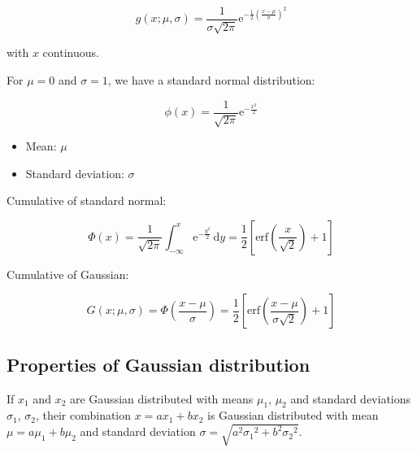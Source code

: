 \begin{equation}\label{eq:gaussian_distr}
	g(x ; \mu, \sigma) = \frac{1}{\sigma \sqrt{2 \pi}} 
	\mathrm{e}^{- \frac{1}{2} {\left( \frac{x - \mu}{\sigma} \right)}^{2}}
\end{equation}

with $x$ continuous. 

For $\mu = 0$ and $\sigma = 1$, we have a standard normal distribution:

\begin{equation}\label{eq:std_normal_distr}
	\phi(x) = \frac{1}{\sqrt{2 \pi}} \mathrm{e}^{- \frac{x^{2}}{2}}
\end{equation}

\begin{itemize}
	\item Mean: $\mu$
	\item Standard deviation: $\sigma$
\end{itemize}

Cumulative of standard normal:

\begin{equation}\label{eq:cdf_std_normal}
	\Phi(x) = \frac{1}{\sqrt{2 \pi}} \int_{-\infty}^{x} \mathrm{e}^{- \frac{y^{2}}{2}} \,\mathrm{d}y 
	= \frac{1}{2} \left[ \mathrm{erf}\left( \frac{x}{\sqrt{2}} \right) + 1 \right]
\end{equation}

Cumulative of Gaussian:

\begin{equation}\label{eq:cdf_Gaussian}
	G(x ; \mu, \sigma) = \Phi \left( \frac{x - \mu}{\sigma} \right) 
	= \frac{1}{2} \left[ \mathrm{erf}\left( \frac{x - \mu}{\sigma \sqrt{2}} \right) + 1 \right]
\end{equation}

\subsection{Properties of Gaussian distribution}
\label{subsec:prop_of_gaussian_distr}

If $x_{1}$ and $x_{2}$ are Gaussian distributed with means $\mu_{1}$, $\mu_{2}$ and standard deviations $\sigma_{1}$, $\sigma_{2}$, their combination $x = a{x}_{1} + b{x}_{2}$ is Gaussian distributed with mean $\mu = a{\mu}_{1} + b{\mu}_{2}$ and standard deviation $\sigma = \sqrt{a^{2}{{\sigma}_{1}}^{2} + b^{2}{{\sigma}_{2}}^{2}}$.


